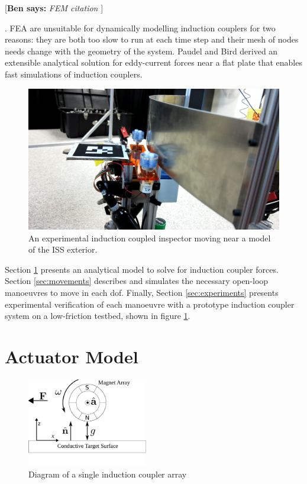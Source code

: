 \documentclass[letterpaper, 10 pt, conference]{ieeeconf}  %
\newcommand{\ben}[1]{{\color{red}\small\par {[{\bf Ben says:} {\em #1}} ] \\    }}
\begin{document}
\ben{FEM citation}
\cite{}. FEA are unsuitable for dynamically modelling induction couplers for two reasons: they are both too slow to run at each time step and their mesh of nodes needs change with the geometry of the system. Paudel and Bird derived an extensible analytical solution for eddy-current forces near a flat plate that enables fast simulations of induction couplers.\cite{Paudel2013}
%
 \begin{figure}[thpb]
      \centering

      \includegraphics[width = 1.0\linewidth]{figures/screenshot.png}
      \caption{An experimental induction coupled inspector moving near a model of the ISS exterior.}
      \label{fig:realpicture}
   \end{figure}

\par Section \ref{sec:model} presents an analytical model to solve for induction coupler forces. Section \ref{sec:movements} describes and simulates the necessary open-loop manoeuvres to move in each dof. Finally, Section \ref{sec:experiments} presents experimental verification of each manoeuvre with a prototype induction coupler system on a low-friction testbed, shown in figure \ref{fig:realpicture}.
%
\section{Actuator Model}
\label{sec:model}
 \begin{figure}[thpb]
      \centering

      \includegraphics[width = 0.47\textwidth]{figures/spin_mag_diagram.pdf}
      \caption{Diagram of a single induction coupler array}
      \label{fig:single_array}
   \end{figure}
   
\end{document}
